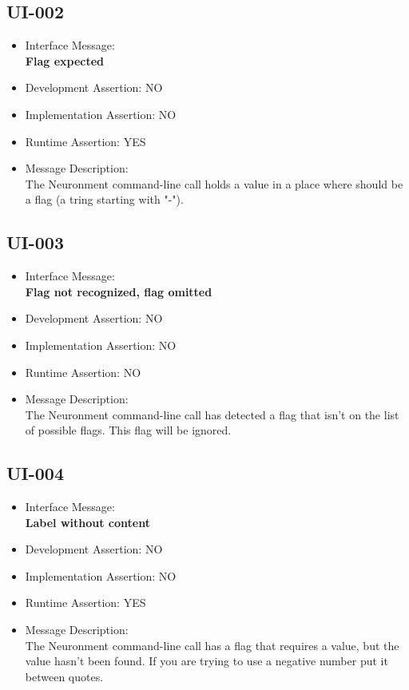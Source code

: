 \subsection{UI-002}
\begin{itemize}
  \item Interface Message:\\[1em]\textbf{Flag expected}
  \item Development Assertion: NO
  \item Implementation Assertion: NO
  \item Runtime Assertion: YES
  \item Message Description:\\[1em]The Neuronment command-line call holds a value in a place where should be a flag (a tring starting with "-").
\end{itemize}

\subsection{UI-003}
\begin{itemize}
  \item Interface Message:\\[1em]\textbf{Flag not recognized, flag omitted}
  \item Development Assertion: NO
  \item Implementation Assertion: NO
  \item Runtime Assertion: NO
  \item Message Description:\\[1em]The Neuronment command-line call has detected a flag that isn't on the list of possible flags. This flag will be ignored.
\end{itemize}

\subsection{UI-004}
\begin{itemize}
  \item Interface Message:\\[1em]\textbf{Label without content}
  \item Development Assertion: NO
  \item Implementation Assertion: NO
  \item Runtime Assertion: YES
  \item Message Description:\\[1em]The Neuronment command-line call has a flag that requires a value, but the value hasn't been found. If you are trying to use a negative number put it between quotes.
\end{itemize}

